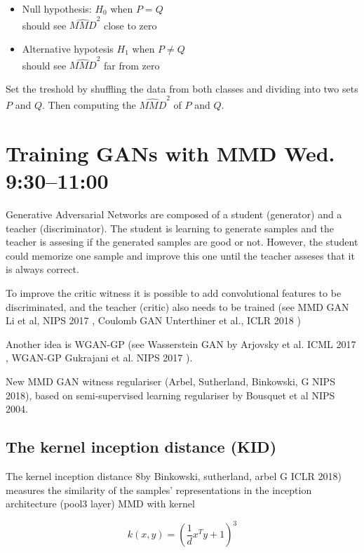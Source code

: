 \documentclass[b5paper]{report}
\begin{document}
\begin{itemize}
  \item Null hypothesis: $H_0$ when $P = Q$ \\
    should see $\hat{MMD}^2$ close to zero
  \item Alternative hypotesis $H_1$ when $P \ne Q$ \\
    should see $\hat{MMD}^2$ far from zero
\end{itemize}

Set the treshold by shuffling the data from both classes and dividing into two
sets $P$ and $Q$. Then computing the $\hat{MMD}^2$ of $P$ and $Q$.

\section{Training GANs with MMD Wed. 9:30--11:00}

Generative Adversarial Networks are composed of a student (generator) and a
teacher (discriminator). The student is learning to generate samples and the
teacher is assesing if the generated samples are good or not. However, the
student could memorize one sample and improve this one until the teacher
asseses that it is always correct.

To improve the critic witness it is possible to add convolutional features to
be discriminated, and the teacher (critic) also needs to be trained (see MMD
GAN Li et al, NIPS 2017 \cite{li2017mmd}, Coulomb GAN Unterthiner et al., ICLR
2018 \cite{unterthiner2017coulomb})

Another idea is WGAN-GP (see Wasserstein GAN by Arjovsky et al. ICML 2017
\cite{arjovsky2017wasserstein}, WGAN-GP Gukrajani et al. NIPS 2017
\cite{DBLP:journals/corr/GulrajaniAADC17}).

New MMD GAN witness regulariser  (Arbel, Sutherland, Binkowski, G NIPS 2018),
based on semi-supervised learning regulariser by Bousquet et al NIPS 2004.

\subsection{The kernel inception distance (KID)}

The kernel inception distance 8by Binkowski, sutherland, arbel G ICLR 2018)
measures the similarity of the samples' representations in the inception
architecture (pool3 layer) MMD with kernel

\begin{equation}
  k(x,y) = (\frac{1}{d}x^Ty+1)^3
\end{equation}
\end{document}
